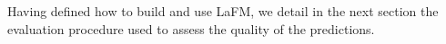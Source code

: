 \documentclass[runningheads]{llncs}
\begin{document}
    









Having defined how to build and use LaFM, we detail in the next section the evaluation procedure used to assess the quality of the predictions.



\end{document}
